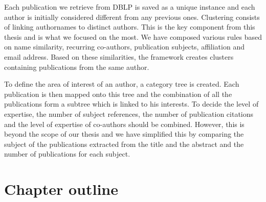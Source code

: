 Each publication we retrieve from DBLP is saved as a unique instance and each author is initially considered different from any previous ones. Clustering consists of linking authornames to distinct authors. This is the key component from this thesis and is what we focused on the most. We have composed various rules based on name similarity, recurring co-authors, publication subjects, affiliation and email address. Based on these similarities, the framework creates clusters containing publications from the same author.

To define the area of interest of an author, a category tree is created. Each publication is then mapped onto this tree and the combination of all the publications form a subtree which is linked to his interests. To decide the level of expertise, the number of subject references, the number of publication citations and the level of expertise of co-authors should be combined. However, this is beyond the scope of our thesis and we have simplified this by comparing the subject of the publications extracted from the title and the abstract and the number of publications for each subject.

%
%
\section{Chapter outline}


